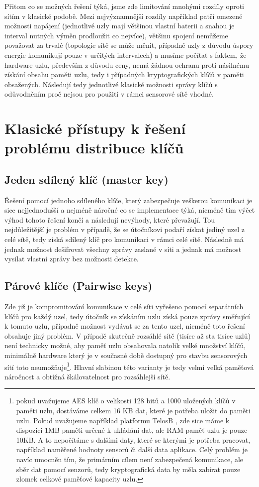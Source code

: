 \documentclass[11pt,final,twoside]{fithesis2}
\begin{document}
Přitom co se možných řešení týká, jsme zde limitování mnohými rozdíly oproti sítím v klasické podobě. Mezi nejvýznamnější rozdíly například
patří omezené možnosti napájení (jednotlivé uzly mají většinou vlastní baterii a snahou je interval nutných výměn prodloužit co nejvíce), 
většinu spojení nemůžeme považovat za trvalé (topologie sítě se může měnit, případně uzly z důvodu úspory energie komunikují pouze v určitých 
intervalech) a musíme počítat s faktem, že hardware uzlu, především z důvodu ceny, nemá žádnou ochranu proti násilnému získání obsahu paměti uzlu, 
tedy i případných kryptografických klíčů v paměti obsažených. Následují tedy jednotlivé klasické možnosti správy klíčů s odůvodněním proč nejsou pro 
použití v rámci sensorové sítě vhodné.

\section{Klasické přístupy k řešení problému distribuce klíčů}
\subsection{Jeden sdílený klíč (master key)} Řešení pomocí jednoho sdíleného klíče, který zabezpečuje veškerou komunikaci je sice nejjednodušší a 
nejméně náročné co se implementace týká, nicméně tím výčet výhod tohoto řešení končí a následují nevýhody, které převažují. Tou nejdůležitější 
je problém v případě, že se útočníkovi podaří získat jediný uzel z celé sítě, tedy získá sdílený klíč pro komunikaci v rámci celé sítě. Následně 
má jednak možnost dešifrovat všechny zprávy zaslané v síti a jednak má možnost vysílat vlastní zprávy bez možnosti detekce.

\subsection{Párové klíče (Pairwise keys)} Zde již je kompromitování komunikace v celé síti vyřešeno pomocí separátních klíčů pro každý uzel, 
tedy útočník se získáním uzlu získá pouze zprávy směřující k tomuto uzlu, případně možnost vydávat se za tento uzel, nicméně toto řešení 
obsahuje jiný problém. V případě skutečně rozsáhlé sítě (tisíce až sta tisíce uzlů) není technicky možné, aby paměť uzlu obsahovala natolik 
velké množství klíčů, minimálně hardware který je v současné době dostupný pro stavbu sensorových sítí toto neumožňuje\footnote{pokud uvažujeme 
AES \cite{Daemen1999} klíč o velikosti 128 bitů a 1000 uložených klíčů v paměti uzlu, dostáváme celkem 16 KB dat, které je potřeba uložit do paměti uzlu. 
Pokud uvažujeme například platformu TelosB \cite{MemsicInc.}, zde sice máme k dispozici 1MB paměti určené k ukládání dat, ale RAM paměť uzlu je pouze 10KB. 
A to nepočítáme s dalšími daty, které se kterými je potřeba pracovat, například naměřené hodnoty sensorů či další data aplikace. Celý problém je navíc umocněn tím, že
primárním cílem není zabezpečená komunikace, ale sběr dat pomocí senzorů, tedy kryptografická data by měla zabírat pouze zlomek celkové paměťové kapacity uzlu.}.
Hlavní slabinou této varianty je tedy velmi velká paměťová náročnost a obtížná škálovatelnost pro rozsáhlejší sítě. 
\end{document}
